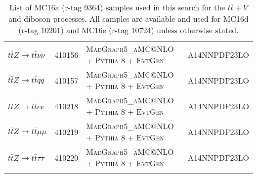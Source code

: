 \begin{table}[h!]
\begin{center}
{\begin{tabular}{@{} lcll @{}}
$t\bar{t}Z \rightarrow t\bar{t}\nu\nu$ & 410156 &\textsc{MadGraph5\_aMC@NLO + Pythia 8 + EvtGen} & A14NNPDF23LO \\
$t\bar{t}Z \rightarrow t\bar{t}qq$ &410157 &\textsc{MadGraph5\_aMC@NLO + Pythia 8 + EvtGen} & A14NNPDF23LO \\
$t\bar{t}Z \rightarrow t\bar{t}ee$ & 410218 &\textsc{MadGraph5\_aMC@NLO + Pythia 8 + EvtGen} & A14NNPDF23LO \\
$t\bar{t}Z \rightarrow t\bar{t}\mu\mu$ & 410219 &\textsc{MadGraph5\_aMC@NLO + Pythia 8 + EvtGen} & A14NNPDF23LO \\
$t\bar{t}Z \rightarrow t\bar{t}\tau\tau$ & 410220 &\textsc{MadGraph5\_aMC@NLO + Pythia 8 + EvtGen} & A14NNPDF23LO \\
 \hhline{====}
\end{tabular}
\caption{List of MC16a (r-tag  9364) samples used in this search for the $t\bar{t}+V$ and diboson processes.  All samples are available and used for MC16d (r-tag 10201) and MC16e (r-tag 10724) unless otherwise stated.}
\label{tab:MCSample2}
}
\end{center}
\end{table}

